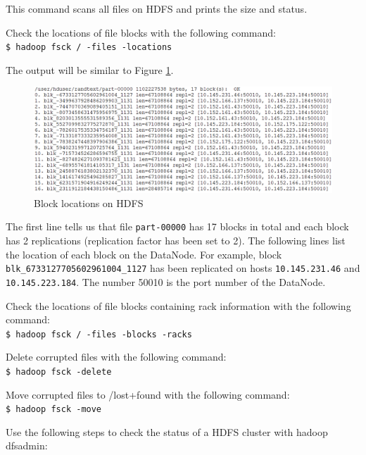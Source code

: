 This command scans all files on HDFS and prints the size and status.

Check the locations of file blocks with the following command: \\
\verb|$ hadoop fsck / -files -locations|

The output will be similar to Figure \ref{fig:hdfs.block.locations}.
\begin{figure}[ht]
  \centering
  \includegraphics[width=.95\textwidth]{figs/5163os_04_07.png}
  \caption{Block locations on HDFS}\label{fig:hdfs.block.locations}
\end{figure} 
The first line tells us that file \verb|part-00000| has 17 blocks in total and each block has 2 replications (replication factor has been set to 2). The following lines list the location of each block on the DataNode. For example, block \verb|blk_6733127705602961004_1127| has been replicated on hosts \verb|10.145.231.46| and \verb|10.145.223.184|. The number 50010 is the port number of the DataNode.

Check the locations of file blocks containing rack information with the following command: \\
\verb|$ hadoop fsck / -files -blocks -racks|

Delete corrupted files with the following command:\\
\verb|$ hadoop fsck -delete|

Move corrupted files to /lost+found with the following command: \\
\verb|$ hadoop fsck -move|

Use the following steps to check the status of a HDFS cluster with hadoop dfsadmin:

